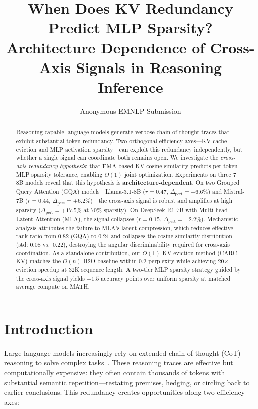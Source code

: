 \documentclass[11pt,a4paper]{article}
\title{When Does KV Redundancy Predict MLP Sparsity?\\Architecture Dependence of Cross-Axis Signals in Reasoning Inference}
\author{
  Anonymous EMNLP Submission
}
\begin{document}
\maketitle

\begin{abstract}
Reasoning-capable language models generate verbose chain-of-thought traces that exhibit substantial token redundancy.
Two orthogonal efficiency axes---KV cache eviction and MLP activation sparsity---can exploit this redundancy independently, but whether a single signal can coordinate both remains open.
We investigate the \emph{cross-axis redundancy hypothesis}: that EMA-based KV cosine similarity predicts per-token MLP sparsity tolerance, enabling $O(1)$ joint optimization.
Experiments on three 7--8B models reveal that this hypothesis is \textbf{architecture-dependent}.
On two Grouped Query Attention (GQA) models---Llama-3.1-8B ($r{=}0.47$, $\Delta_\text{pert}{=}{+}6.6\%$) and Mistral-7B ($r{=}0.44$, $\Delta_\text{pert}{=}{+}6.2\%$)---the cross-axis signal is robust and amplifies at high sparsity ($\Delta_\text{pert}{=}{+}17.5\%$ at 70\% sparsity).
On DeepSeek-R1-7B with Multi-head Latent Attention (MLA), the signal collapses ($r{=}0.15$, $\Delta_\text{pert}{=}{-}2.2\%$).
Mechanistic analysis attributes the failure to MLA's latent compression, which reduces effective rank ratio from 0.82 (GQA) to 0.24 and collapses the cosine similarity distribution (std: $0.08$ vs.\ $0.22$), destroying the angular discriminability required for cross-axis coordination.
As a standalone contribution, our $O(1)$ KV eviction method (CARC-KV) matches the $O(n)$ H2O baseline within 0.2 perplexity while achieving 20$\times$ eviction speedup at 32K sequence length.
A two-tier MLP sparsity strategy guided by the cross-axis signal yields $+1.5$ accuracy points over uniform sparsity at matched average compute on MATH.
\end{abstract}

\section{Introduction}
\label{sec:intro}

Large language models increasingly rely on extended chain-of-thought (CoT) reasoning to solve complex tasks~\cite{wei2022chain,deepseek2025r1}.
These reasoning traces are effective but computationally expensive: they often contain thousands of tokens with substantial semantic repetition---restating premises, hedging, or circling back to earlier conclusions.
This redundancy creates opportunities along two efficiency axes:
\end{document}
